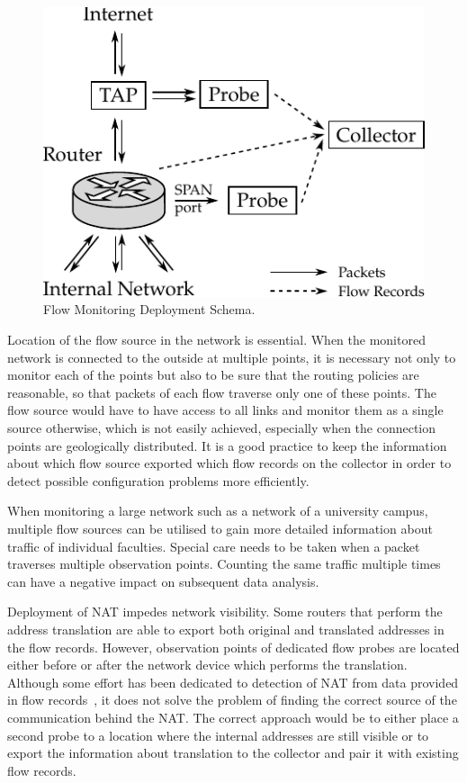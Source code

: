 \begin{figure}[t!]
  \begin{center}
    \includegraphics{figures/c02/flow-monitoring-deployment}
  \end{center}
  \caption{Flow Monitoring Deployment Schema.}
  \label{fig:flow_monitoring_deployment}
\end{figure}

Location of the flow source in the network is essential. When the monitored network is connected to the outside at multiple points, it is necessary not only to monitor each of the points but also to be sure that the routing policies are reasonable, so that packets of each flow traverse only one of these points. The flow source would have to have access to all links and monitor them as a single source otherwise, which is not easily achieved, especially when the connection points are geologically distributed. It is a good practice to keep the information about which flow source exported which flow records on the collector in order to detect possible configuration problems more efficiently.

When monitoring a large network such as a network of a university campus, multiple flow sources can be utilised to gain more detailed information about traffic of individual faculties. Special care needs to be taken when a packet traverses multiple observation points. Counting the same traffic multiple times can have a negative impact on subsequent data analysis.

Deployment of NAT impedes network visibility. Some routers that perform the address translation are able to export both original and translated addresses in the flow records. However, observation points of dedicated flow probes are located either before or after the network device which performs the translation. Although some effort has been dedicated to detection of NAT from data provided in flow records~\cite{Abt-2013-Passive, Krmicek-2009-Netflow}, it does not solve the problem of finding the correct source of the communication behind the NAT. The correct approach would be to either place a second probe to a location where the internal addresses are still visible or to export the information about translation to the collector and pair it with existing flow records.


